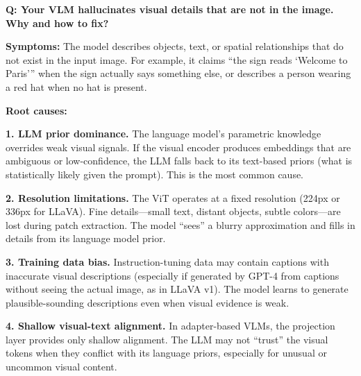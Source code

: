 \begin{interviewq}
\textbf{Q: Your VLM hallucinates visual details that are not in the image. Why and how to fix?}

 \quad {} \quad \badgefreq{\freqhigh}

\stronganswer

\textbf{Symptoms:} The model describes objects, text, or spatial relationships that do not exist in the input image. For example, it claims ``the sign reads `Welcome to Paris''' when the sign actually says something else, or describes a person wearing a red hat when no hat is present.

\textbf{Root causes:}

\textbf{1. LLM prior dominance.} The language model's parametric knowledge overrides weak visual signals. If the visual encoder produces embeddings that are ambiguous or low-confidence, the LLM falls back to its text-based priors (what is statistically likely given the prompt). This is the most common cause.

\textbf{2. Resolution limitations.} The ViT operates at a fixed resolution (224px or 336px for LLaVA). Fine details---small text, distant objects, subtle colors---are lost during patch extraction. The model ``sees'' a blurry approximation and fills in details from its language model prior.

\textbf{3. Training data bias.} Instruction-tuning data may contain captions with inaccurate visual descriptions (especially if generated by GPT-4 from captions without seeing the actual image, as in LLaVA v1). The model learns to generate plausible-sounding descriptions even when visual evidence is weak.

\textbf{4. Shallow visual-text alignment.} In adapter-based VLMs, the projection layer provides only shallow alignment. The LLM may not ``trust'' the visual tokens when they conflict with its language priors, especially for unusual or uncommon visual content.


\end{interviewq}
